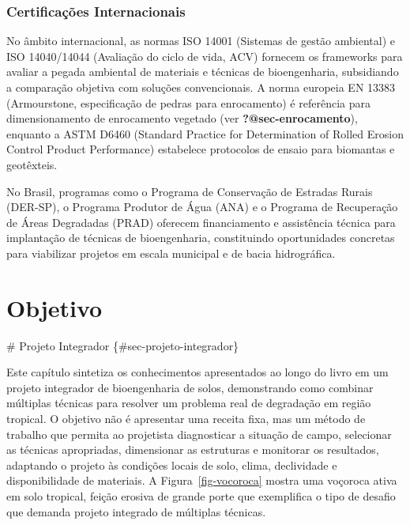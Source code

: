 \documentclass[
  portuguese,
  11pt,
  a4paper,
  open=any]{scrbook}
\begin{document}
\subsection{Certificações
Internacionais}\label{certificauxe7uxf5es-internacionais}

No âmbito internacional, as normas ISO 14001 (Sistemas de gestão
ambiental) e ISO 14040/14044 (Avaliação do ciclo de vida, ACV) fornecem
os frameworks para avaliar a pegada ambiental de materiais e técnicas de
bioengenharia, subsidiando a comparação objetiva com soluções
convencionais. A norma europeia EN 13383 (Armourstone, especificação de
pedras para enrocamento) é referência para dimensionamento de
enrocamento vegetado (ver \textbf{?@sec-enrocamento}), enquanto a ASTM
D6460 (Standard Practice for Determination of Rolled Erosion Control
Product Performance) estabelece protocolos de ensaio para biomantas e
geotêxteis.

\begin{tcolorbox}[enhanced jigsaw, leftrule=.75mm, colframe=quarto-callout-tip-color-frame, colback=white, bottomrule=.15mm, opacityback=0, colbacktitle=quarto-callout-tip-color!10!white, breakable, bottomtitle=1mm, opacitybacktitle=0.6, title=\textcolor{quarto-callout-tip-color}{\faLightbulb}\hspace{0.5em}{Incentivos financeiros}, titlerule=0mm, toprule=.15mm, toptitle=1mm, rightrule=.15mm, left=2mm, arc=.35mm, coltitle=black]

No Brasil, programas como o Programa de Conservação de Estradas Rurais
(DER-SP), o Programa Produtor de Água (ANA) e o Programa de Recuperação
de Áreas Degradadas (PRAD) oferecem financiamento e assistência técnica
para implantação de técnicas de bioengenharia, constituindo
oportunidades concretas para viabilizar projetos em escala municipal e
de bacia hidrográfica.

\end{tcolorbox}

\chapter{Objetivo}\label{objetivo}

\# Projeto Integrador \{\#sec-projeto-integrador\}

Este capítulo sintetiza os conhecimentos apresentados ao longo do livro
em um projeto integrador de bioengenharia de solos, demonstrando como
combinar múltiplas técnicas para resolver um problema real de degradação
em região tropical. O objetivo não é apresentar uma receita fixa, mas um
método de trabalho que permita ao projetista diagnosticar a situação de
campo, selecionar as técnicas apropriadas, dimensionar as estruturas e
monitorar os resultados, adaptando o projeto às condições locais de
solo, clima, declividade e disponibilidade de materiais. A
Figura~\ref{fig-vocoroca} mostra uma voçoroca ativa em solo tropical,
feição erosiva de grande porte que exemplifica o tipo de desafio que
demanda projeto integrado de múltiplas técnicas.
\end{document}
